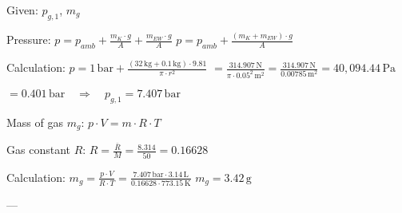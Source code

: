 Given: \( p_{g,1} \), \( m_g \)  

Pressure:  
\( p = p_{amb} + \frac{m_K \cdot g}{A} + \frac{m_{EW} \cdot g}{A} \)  
\( p = p_{amb} + \frac{(m_K + m_{EW}) \cdot g}{A} \)  

Calculation:  
\( p = 1 \, \text{bar} + \frac{(32 \, \text{kg} + 0.1 \, \text{kg}) \cdot 9.81}{\pi \cdot r^2} \)  
\( = \frac{314.907 \, \text{N}}{\pi \cdot 0.05^2 \, \text{m}^2} = \frac{314.907 \, \text{N}}{0.00785 \, \text{m}^2} = 40,094.44 \, \text{Pa} \)  

\( = 0.401 \, \text{bar} \quad \Rightarrow \quad p_{g,1} = 7.407 \, \text{bar} \)  

Mass of gas \( m_g \):  
\( p \cdot V = m \cdot R \cdot T \)  

Gas constant \( R \):  
\( R = \frac{\bar{R}}{M} = \frac{8.314}{50} = 0.16628 \)  

Calculation:  
\( m_g = \frac{p \cdot V}{R \cdot T} = \frac{7.407 \, \text{bar} \cdot 3.14 \, \text{L}}{0.16628 \cdot 773.15 \, \text{K}} \)  
\( m_g = 3.42 \, \text{g} \)  

---
